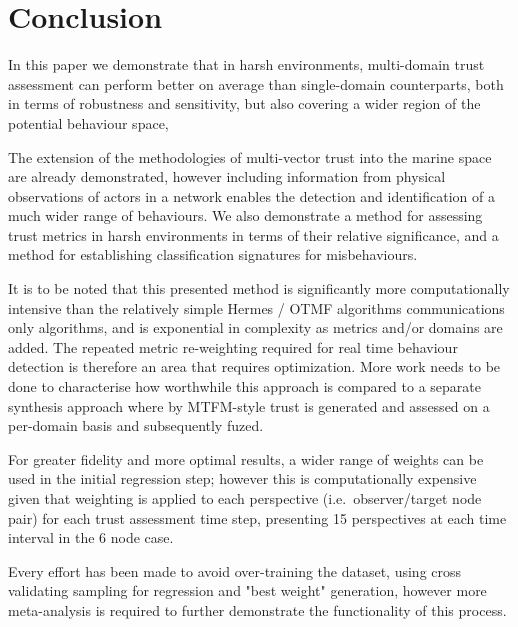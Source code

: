 \section{Conclusion}
In this paper we demonstrate that in harsh environments, multi-domain trust assessment can perform better on average than single-domain counterparts, both in terms of robustness and sensitivity, but also covering a wider region of the potential behaviour space, 

The extension of the methodologies of multi-vector trust into the marine space are already demonstrated, however including information from physical observations of actors in a network enables the detection and identification of a much wider range of behaviours.
We also demonstrate a method for assessing trust metrics in harsh environments in terms of their relative significance, and a method for establishing classification signatures for misbehaviours.

It is to be noted that this presented method is significantly more computationally intensive than the relatively simple Hermes / OTMF algorithms communications only algorithms, and is exponential in complexity as metrics and/or domains are added. The repeated metric re-weighting required for real time behaviour detection is therefore an area that requires optimization. More work needs to be done to characterise how worthwhile this approach is compared to a separate synthesis approach where by MTFM-style trust is generated and assessed on a per-domain basis and subsequently fuzed.

For greater fidelity and more optimal results, a wider range of weights can be used in the initial regression step; however this is computationally expensive given that weighting is applied to each perspective (i.e.\ observer/target node pair) for each trust assessment time step, presenting 15 perspectives at each time interval in the 6 node case.

Every effort has been made to avoid over-training the dataset, using cross validating sampling for regression and "best weight" generation, however more meta-analysis is required to further demonstrate the functionality of this process.



